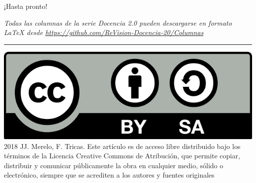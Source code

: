 \documentclass[twoside,10pt]{article}
\newcommand{\surl}[1]{{\small\url{#1}}}
\begin{document}
\begin{multicols}{2}
\smallskip

\noindent ¡Hasta pronto!

\medskip

\noindent\emph{Todas las columnas de la serie Docencia 2.0
pueden descargarse en formato LaTeX desde
\surl{https://github.com/ReVision-Docencia-20/Columnas}}

\noindent\rule{90mm}{1pt}

{\small \noindent\includegraphics[height = 4ex]{CC.png} 2018 JJ.
Merelo, F. Tricas. Este artículo es de acceso libre distribuido bajo
los términos
de la Licencia Creative Commons de Atribución, que permite copiar,
distribuir y comunicar públicamente la obra en cualquier medio, sólido
o electrónico, siempre que se acrediten a los autores y fuentes
originales}

\end{multicols}
\end{document}
